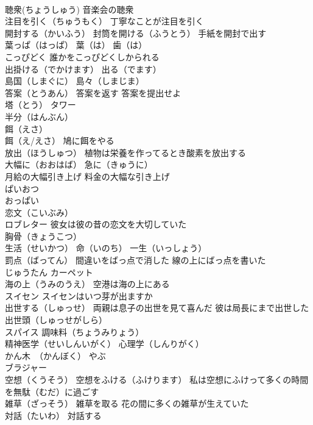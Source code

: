 \documentclass[8pt]{extreport}
\begin{document}
\begin{CJK}{UTF8}{min}
\\	聴衆(ちょうしゅう) 音楽会の聴衆
\\	注目を引く（ちゅうもく） 丁寧なことが注目を引く
\\	開封する（かいふう） 封筒を開ける（ふうとう） 手紙を開封で出す
\\	葉っぱ（はっぱ） 葉（は） 歯（は）
\\	こっぴどく 誰かをこっぴどくしかられる
\\	出掛ける（でかけます） 出る（でます）
\\	島国（しまぐに） 島々（しまじま）
\\	答案（とうあん） 答案を返す 答案を提出せよ
\\	塔（とう） タワー 
\\	半分（はんぶん）
\\	餌（えさ） 
\\	餌（え/えさ） 鳩に餌をやる
\\	放出（ほうしゅつ） 植物は栄養を作ってるとき酸素を放出する
\\	大幅に（おおはば） 急に（きゅうに）
\\	月給の大幅引き上げ 料金の大幅な引き上げ
\\	ぱいおつ 
\\	おっぱい
\\	恋文（こいぶみ）
\\	ロブレター 彼女は彼の昔の恋文を大切していた
\\	胸骨（きょうこつ）
\\	生活（せいかつ） 命（いのち） 一生（いっしょう）
\\	罰点（ばってん） 間違いをばっ点で消した 線の上にばっ点を書いた
\\	じゅうたん カーペット
\\	海の上（うみのうえ） 空港は海の上にある
\\	スイセン スイセンはいつ芽が出ますか
\\	出世する（しゅっせ） 両親は息子の出世を見て喜んだ 彼は局長にまで出世した 出世頭（しゅっせがしら）
\\	スパイス 調味料（ちょうみりょう）
\\	精神医学（せいしんいがく） 心理学（しんりがく）
\\	かん木　（かんぼく） やぶ
\\	ブラジャー
\\	空想（くうそう） 空想をふける（ふけります） 私は空想にふけって多くの時間を無駄（むだ）に過ごす
\\	雑草（ざっそう） 雑草を取る 花の間に多くの雑草が生えていた
\\	対話（たいわ） 対話する

\end{CJK}
\end{document}

